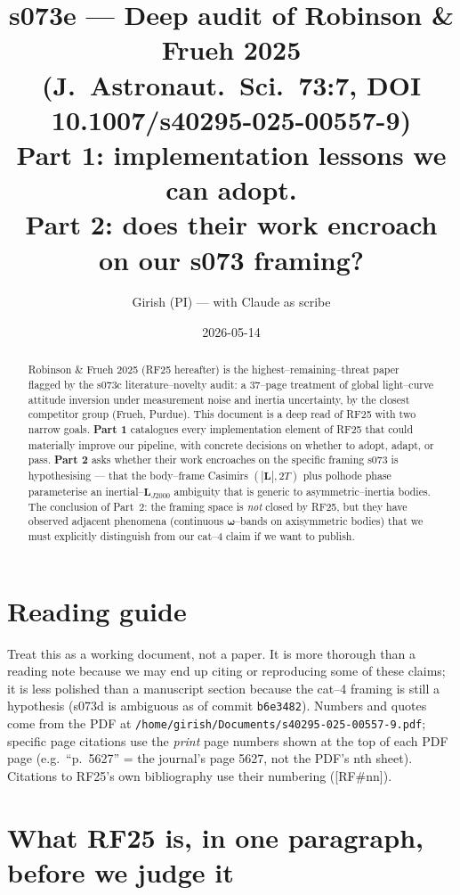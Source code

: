 \documentclass[11pt]{article}
\title{s073e --- Deep audit of Robinson \& Frueh 2025\\
       (J.~Astronaut.~Sci.~73:7, DOI 10.1007/s40295-025-00557-9)\\
       \large Part 1: implementation lessons we can adopt.\\
              Part 2: does their work encroach on our s073 framing?}
\author{Girish (PI) --- with Claude as scribe}
\date{2026-05-14}
\newcommand{\Lvec}{\mathbf{L}}
\newcommand{\LJ}{\Lvec_{J2000}}
\newcommand{\wvec}{\boldsymbol{\omega}}
\newcommand{\ttt}[1]{\texttt{#1}}
\begin{document}
\maketitle

\begin{abstract}
\noindent
Robinson \& Frueh 2025 (RF25 hereafter) is the highest--remaining--threat paper
flagged by the s073c literature--novelty audit: a 37--page treatment of
global light--curve attitude inversion under measurement noise and inertia
uncertainty, by the closest competitor group (Frueh, Purdue). This document is a
deep read of RF25 with two narrow goals.
\textbf{Part 1} catalogues every implementation element of RF25 that could
materially improve our pipeline, with concrete decisions on whether to adopt,
adapt, or pass. \textbf{Part 2} asks whether their work encroaches on the
specific framing s073 is hypothesising --- that the body--frame Casimirs
$(|\Lvec|, 2T)$ plus polhode phase parameterise an inertial--$\LJ$ ambiguity that
is generic to asymmetric--inertia bodies. The conclusion of Part~2: the framing
space is \emph{not} closed by RF25, but they have observed adjacent phenomena
(continuous $\wvec$--bands on axisymmetric bodies) that we must explicitly
distinguish from our cat--4 claim if we want to publish.
\end{abstract}

\section*{Reading guide}
\noindent
Treat this as a working document, not a paper. It is more thorough than a
reading note because we may end up citing or reproducing some of these claims;
it is less polished than a manuscript section because the cat--4 framing is
still a hypothesis (s073d is ambiguous as of commit \ttt{b6e3482}). Numbers and
quotes come from the PDF at \ttt{/home/girish/Documents/s40295-025-00557-9.pdf};
specific page citations use the \emph{print} page numbers shown at the top of
each PDF page (e.g.\ ``p.~5627'' = the journal's page 5627, not the PDF's nth
sheet). Citations to RF25's own bibliography use their numbering ([RF\#nn]).

\section{What RF25 is, in one paragraph, before we judge it}
\end{document}
